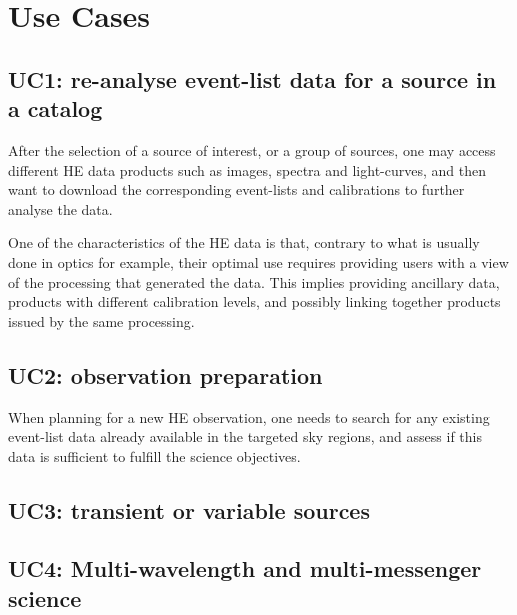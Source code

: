 \documentclass[11pt,a4paper]{ivoa}
\begin{document}


\section{Use Cases}

\subsection{UC1: re-analyse event-list data for a source in a catalog}

After the selection of a source of interest, or a group of sources, one may access different HE data products such as images, spectra and light-curves, and then want to download the corresponding event-lists and calibrations to further analyse the data.

One of the characteristics of the HE data is that, contrary to what is usually done in optics for example, their optimal use requires providing users with a view of the processing that generated the data. This implies providing ancillary data, products with different calibration levels, and possibly linking together products issued by the same processing.


\subsection{UC2: observation preparation}

When planning for a new HE observation, one needs to search for any existing event-list data already available in the targeted sky regions, and assess if this data is sufficient to fulfill the science objectives.



\subsection{UC3: transient or variable sources}




\subsection{UC4: Multi-wavelength and multi-messenger science}
\end{document}
